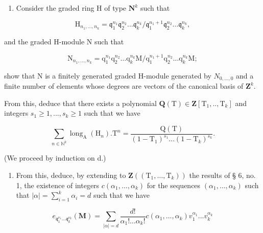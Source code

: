 \begin{enumerate}
\def\labelenumi{\alph{enumi})}
\setcounter{enumi}{1}
\tightlist
\item
  Consider the graded ring H of type \(\mathbf{N}^k\) such that
\end{enumerate}

\[
\mathrm{H} _ {n _ {1}, \dots , n _ {k}} = \mathfrak {q} _ {1} ^ {n _ {1}} \mathfrak {q} _ {2} ^ {n _ {2}} \dots \mathfrak {q} _ {k} ^ {n _ {k}} / \mathfrak {q} _ {1} ^ {n _ {1} + 1} \mathfrak {q} _ {2} ^ {n _ {2}} \dots \mathfrak {q} _ {k} ^ {n _ {k}},
\]

and the graded H-module N such that

\[
 \mathrm{N} _ {n _ {1}, \dots , n _ {k}} = \mathrm{q} _ {1} ^ {n _ {1}} \mathrm{q} _ {2} ^ {n _ {2}} \dots \mathrm{q} _ {k} ^ {n _ {k}} \mathrm{M} / \mathrm{q} _ {1} ^ {n _ {1} + 1} \mathrm{q} _ {2} ^ {n _ {2}} \dots \mathrm{q} _ {k} ^ {n _ {k}} \mathrm{M};
\]

show that N is a finitely generated graded H-module generated by \(N_{0,\ldots,0}\) and a finite number of elements whose degrees are vectors of the canonical basis of \(\mathbf{Z}^{k}\).

From this, deduce that there exists a polynomial \(\mathbf{Q}(\mathrm{T}) \in \mathbf{Z}[\mathrm{T}_1,..,\mathrm{T}_k]\) and integers \(s_1 \geqslant 1, ..., s_k \geqslant 1\) such that we have

\[
\sum_ {n \in \mathbb {N} ^ {k}} \operatorname{long} _ {\mathrm{A}} (\mathrm{H} _ {n}). \mathrm{T} ^ {n} = \frac {\mathrm{Q} (\mathrm{T})}{(1 - \mathrm{T} _ {1}) ^ {s _ {1}} \dots (1 - \mathrm{T} _ {k}) ^ {s _ {k}}}.
\]

(We proceed by induction on d.)

\begin{enumerate}
\def\labelenumi{\alph{enumi})}
\setcounter{enumi}{2}
\tightlist
\item
  From this, deduce, by extending to \(\mathbf{Z}((\mathrm{T}_{1},\ldots,\mathrm{T}_{k}))\) the results of § 6, no. 1, the existence of integers \(c(\alpha_{1},\ldots,\alpha_{k})\) for the sequences \((\alpha_{1},\ldots,\alpha_{k})\) such that \(|\alpha| = \sum_{i=1}^{k}\alpha_{i} = d\) such that we have
\end{enumerate}

\[
e _ {\mathfrak {q} _ {1} ^ {\nu_ {1}} \dots \mathfrak {q} _ {k} ^ {\nu_ {k}}} (\mathbf {M}) = \sum_ {| \alpha | = d} \frac {d !}{\alpha_ {1} ! \dots \alpha_ {k} !} c (\alpha_ {1},..., \alpha_ {k}) v _ {1} ^ {\alpha_ {1}}... v _ {k} ^ {\alpha_ {k}}
\]

